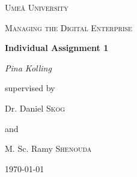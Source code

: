 \documentclass[a4]{scrartcl}
\begin{document}
	
	\begin{titlepage}
		\centering
		{\scshape\LARGE Umeå University \par}
		\vspace{1cm}
		{\scshape\Large Managing the Digital Enterprise \par }
		\vspace{1.5cm}
		{\huge\bfseries  Individual Assignment 1 \par}
		\vspace{2cm}
		{\Large\itshape Pina Kolling\par}
		\vfill
		supervised by \par 
		\vspace{1cm}
		Dr. Daniel \textsc{Skog} \par 
		and \par 
		M. Sc. Ramy \textsc{Shenouda} 
		
		\vfill
		
		{\large \today\par}
	\end{titlepage}
	
	\setcounter{page}{1}
	
	\begin{doublespace}
		\tableofcontents
	\end{doublespace}

	
	\newpage
	
	
	
\end{document}
